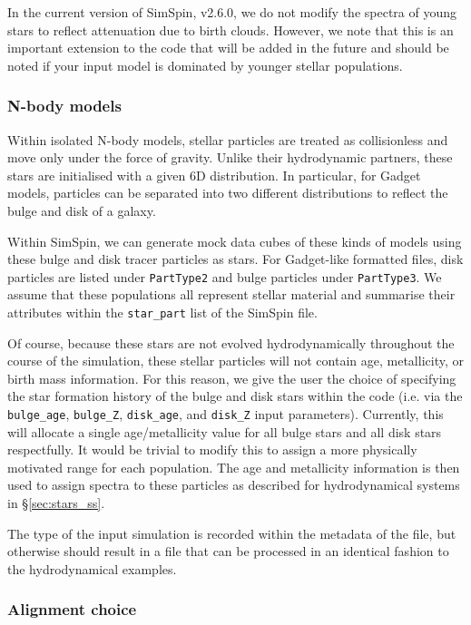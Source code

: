 \documentclass[
  journal=pasa,
  manuscript=research-paper, %
  year=2020,
  volume=37,
]{cup-journal}
\newcommand{\ssversion}[1]{v2.6.0#1}
\begin{document}
In the current version of SimSpin, \ssversion, we do not modify the spectra of young stars to reflect attenuation due to birth clouds. 
However, we note that this is an important extension to the code that will be added in the future and should be noted if your input model is dominated by younger stellar populations.

\subsubsection{N-body models}
\label{sec:nbody_ss}

Within isolated N-body models, stellar particles are treated as collisionless and move only under the force of gravity. Unlike their hydrodynamic partners, these stars are initialised with a given 6D distribution. In particular, for Gadget models, particles can be separated into two different distributions to reflect the bulge and disk of a galaxy.

Within SimSpin, we can generate mock data cubes of these kinds of models using these bulge and disk tracer particles as stars. For Gadget-like formatted files, disk particles are listed under \texttt{PartType2} and bulge particles under \texttt{PartType3}. We assume that these populations all represent stellar material and summarise their attributes within the \texttt{star\_part} list of the SimSpin file.

Of course, because these stars are not evolved hydrodynamically throughout the course of the simulation, these stellar particles will not contain age, metallicity, or birth mass information. For this reason, we give the user the choice of specifying the star formation history of the bulge and disk stars within the code (i.e. via the \texttt{bulge\_age}, \texttt{bulge\_Z}, \texttt{disk\_age}, and \texttt{disk\_Z} input parameters). Currently, this will allocate a single age/metallicity value for all bulge stars and all disk stars respectfully. It would be trivial to modify this to assign a more physically motivated range for each population. The age and metallicity information is then used to assign spectra to these particles as described for hydrodynamical systems in \S \ref{sec:stars_ss}.

The type of the input simulation is recorded within the metadata of the file, but otherwise should result in a file that can be processed in an identical fashion to the hydrodynamical examples.

\subsubsection{Alignment choice}
\end{document}

